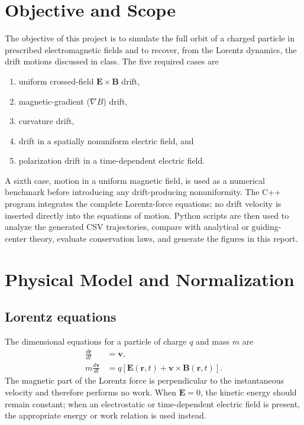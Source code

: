 \documentclass[11pt,a4paper]{article}
\newcommand{\vect}[1]{\boldsymbol{#1}}
\begin{document}
\tableofcontents
\newpage

\section{Objective and Scope}

The objective of this project is to simulate the full orbit of a charged particle in prescribed electromagnetic fields and to recover, from the Lorentz dynamics, the drift motions discussed in class. The five required cases are
\begin{enumerate}[label=\arabic*.]
    \item uniform crossed-field $\vect{E}\times\vect{B}$ drift,
    \item magnetic-gradient ($\nabla B$) drift,
    \item curvature drift,
    \item drift in a spatially nonuniform electric field, and
    \item polarization drift in a time-dependent electric field.
\end{enumerate}

A sixth case, motion in a uniform magnetic field, is used as a numerical benchmark before introducing any drift-producing nonuniformity. The C++ program integrates the complete Lorentz-force equations; no drift velocity is inserted directly into the equations of motion. Python scripts are then used to analyze the generated CSV trajectories, compare with analytical or guiding-center theory, evaluate conservation laws, and generate the figures in this report.

\section{Physical Model and Normalization}

\subsection{Lorentz equations}

The dimensional equations for a particle of charge $q$ and mass $m$ are
\begin{align}
    \frac{d\vect{r}}{dt} &= \vect{v}, \\
    m\frac{d\vect{v}}{dt} &= q\left[\vect{E}(\vect{r},t)+\vect{v}\times\vect{B}(\vect{r},t)\right].
    \label{eq:lorentz_dimensional}
\end{align}
The magnetic part of the Lorentz force is perpendicular to the instantaneous velocity and therefore performs no work. When $\vect{E}=0$, the kinetic energy should remain constant; when an electrostatic or time-dependent electric field is present, the appropriate energy or work relation is used instead.
\end{document}
